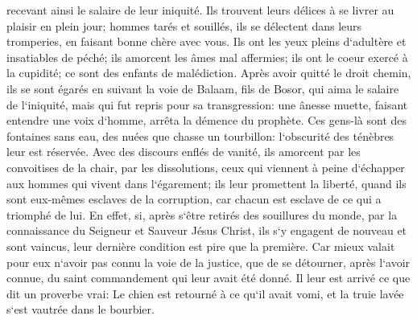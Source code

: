 \verse recevant ainsi le salaire de leur iniquité. Ils trouvent leurs délices à se livrer au plaisir en plein jour; hommes tarés et souillés, ils se délectent dans leurs tromperies, en faisant bonne chère avec vous. 
\verse Ils ont les yeux pleins d`adultère et insatiables de péché; ils amorcent les âmes mal affermies; ils ont le coeur exercé à la cupidité; ce sont des enfants de malédiction. 
\verse Après avoir quitté le droit chemin, ils se sont égarés en suivant la voie de Balaam, fils de Bosor, qui aima le salaire de l`iniquité, 
\verse mais qui fut repris pour sa transgression: une ânesse muette, faisant entendre une voix d`homme, arrêta la démence du prophète. 
\verse Ces gens-là sont des fontaines sans eau, des nuées que chasse un tourbillon: l`obscurité des ténèbres leur est réservée. 
\verse Avec des discours enflés de vanité, ils amorcent par les convoitises de la chair, par les dissolutions, ceux qui viennent à peine d`échapper aux hommes qui vivent dans l`égarement; 
\verse ils leur promettent la liberté, quand ils sont eux-mêmes esclaves de la corruption, car chacun est esclave de ce qui a triomphé de lui. 
\verse En effet, si, après s`être retirés des souillures du monde, par la connaissance du Seigneur et Sauveur Jésus Christ, ils s`y engagent de nouveau et sont vaincus, leur dernière condition est pire que la première. 
\verse Car mieux valait pour eux n`avoir pas connu la voie de la justice, que de se détourner, après l`avoir connue, du saint commandement qui leur avait été donné. 
\verse Il leur est arrivé ce que dit un proverbe vrai: Le chien est retourné à ce qu`il avait vomi, et la truie lavée s`est vautrée dans le bourbier. 


